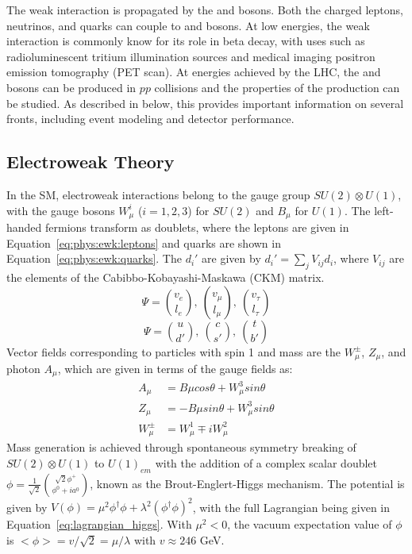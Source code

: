 The weak interaction is propagated by the \W and \Z bosons. Both the charged leptons, neutrinos, and quarks can couple to \W and \Z bosons.  At low energies, the weak interaction is commonly know for its role in beta decay, with uses such as radioluminescent tritium illumination sources and medical imaging positron emission tomography (PET scan).  At energies achieved by the LHC, the \W and \Z bosons can be produced in $pp$ collisions and the properties of the production can be studied. As described in below, this provides important information on several fronts, including event modeling and detector performance.



\subsection{Electroweak Theory}\label{ch:sm:ewk}
In the SM\cite{SMEWK1,SMEWK2,SMEWK3}, electroweak interactions belong to the gauge group $SU(2) \otimes U(1)$, with the gauge bosons $W_{\mu}^i$ ($i = 1,2,3$) for $SU(2)$ and  $B_{\mu}$ for $U(1)$.  The left-handed fermions transform as doublets, where the leptons are given in Equation~\ref{eq:phys:ewk:leptons} and quarks are shown in Equation~\ref{eq:phys:ewk:quarks}. The $d_i'$ are given by $d_i' = \sum_j V_{ij} d_i$, where $V_{ij}$ are the elements of the Cabibbo-Kobayashi-Maskawa (CKM) matrix\cite{ckm1,ckm2}.
\begin{equation}
  \Psi=\binom{v_e}{l_e},~\binom{v_{\mu}}{l_{\mu}},~\binom{v_{\tau}}{l_{\tau}}
  \label{eq:phys:ewk:leptons}
\end{equation}
\begin{equation}
  \Psi=\binom{u}{d'},~\binom{c}{s'},~\binom{t}{b'}
  \label{eq:phys:ewk:quarks}
\end{equation}
Vector fields corresponding to particles with spin 1 and mass are the $W_\mu^\pm$, $Z_\mu$, and photon $A_\mu$, which are given in terms of the gauge fields as:
\begin{equation}
\begin{aligned}
A_\mu &= B\mu cos\theta + W^3_\mu sin\theta\\
Z_\mu &= -B\mu sin\theta + W^3_\mu sin\theta\\
W_\mu^\pm &= W_\mu^1 \mp i W^2_\mu
\end{aligned}
\label{eq:ewk_s1_particles}
\end{equation}
Mass generation is achieved through spontaneous symmetry breaking of $SU(2)\otimes U(1)$ to $U(1)_{em}$ with the addition of a complex scalar doublet $\phi = \frac{1}{\sqrt{2}}\binom{\sqrt{2}\phi^+}{\phi^0 + ia^0}$, known as the Brout-Englert-Higgs mechanism\cite{ewsb1,ewsb2,ewsb3}. The potential is given by $V(\phi) = \mu^2\phi^\dagger\phi + \lambda^2(\phi^\dagger \phi)^2$, with the full Lagrangian being given in Equation~\ref{eq:lagrangian_higgs}. With $\mu^2 < 0$, the vacuum expectation value of $\phi$ is $<\phi> = v/\sqrt{2} = \mu/\lambda$ with $v\approx 246$ GeV. 


